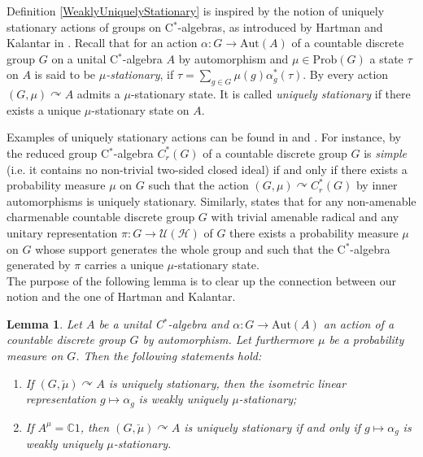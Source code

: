 \documentclass[a4paper,11pt,reqno]{amsart}
\numberwithin{equation}{section}
\newtheorem{lemma}[theorem]{Lemma}
\theoremstyle{definition}
\theoremstyle{remark}
\theoremstyle{remark}
\begin{document}
Definition \ref{WeaklyUniquelyStationary} is inspired by the notion of uniquely stationary actions of groups on C$^{\ast}$-algebras, as introduced by Hartman and Kalantar in \cite{HartmanKalantar}. Recall that for an action $\alpha:G\rightarrow\text{Aut}(A)$ of a countable discrete group $G$ on a unital C$^{\ast}$-algebra $A$ by automorphism and $\mu\in\text{Prob}(G)$ a state $\tau$ on $A$ is said to be \emph{$\mu$-stationary}, if $\tau=\sum_{g\in G}\mu(g)\alpha_{g}^{\ast}(\tau)$. By \cite[Proposition 4.2]{HartmanKalantar} every action $(G,\mu)\curvearrowright A$ admits a $\mu$-stationary state. It is called \emph{uniquely stationary} if there exists a unique $\mu$-stationary state on $A$.

Examples of uniquely stationary actions can be found in \cite{HartmanKalantar} and \cite{BaderBoutonnetHoudayerPeterson}. For instance, by \cite[Theorem 5.1]{HartmanKalantar} the reduced group C$^{\ast}$-algebra $C_{r}^{\ast}(G)$ of a countable discrete group $G$ is \emph{simple} (i.e. it contains no non-trivial two-sided closed ideal) if and only if there exists a probability measure $\mu$ on $G$ such that the action $(G,\mu)\curvearrowright C_{r}^{\ast}(G)$ by inner automorphisms is uniquely stationary. Similarly, \cite[Proposition 3.7]{BaderBoutonnetHoudayerPeterson} states that for any non-amenable charmenable countable discrete group $G$ with trivial amenable radical and any unitary representation $\pi:G\rightarrow\mathcal{U}(\mathcal{H})$ of $G$ there exists a probability measure $\mu$ on $G$ whose support generates the whole group and such that the C$^{\ast}$-algebra generated by $\pi$ carries a unique $\mu$-stationary state. \\

The purpose of the following lemma is to clear up the connection between our notion and the one of Hartman and Kalantar.

\begin{lemma} \label{Connection} Let $A$ be a unital C$^{\ast}$-algebra and $\alpha:G\rightarrow\text{Aut}(A)$ an action of a countable discrete group $G$ by automorphism. Let furthermore $\mu$ be a probability measure on $G$. Then the following statements hold: 
\begin{enumerate}
\item If $(G,\breve{\mu})\curvearrowright A$ is uniquely stationary, then the isometric linear representation $g\mapsto\alpha_{g}$ is weakly uniquely $\mu$-stationary; 
\item If $A^{\mu}=\mathbb{C}1$, then $(G,\breve{\mu})\curvearrowright A$ is uniquely stationary if and only if $g\mapsto\alpha_{g}$ is weakly uniquely $\mu$-stationary. 
\end{enumerate}
\end{lemma}
\end{document}
